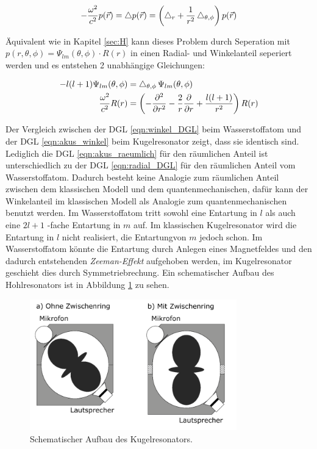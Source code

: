 \begin{equation}
    - \frac{\omega^2}{c^2} p(\vec{r}) = \mathop{}\!\mathbin\bigtriangleup p(\vec{r}) = \left( \mathop{}\!\mathbin\bigtriangleup_r + \frac{1}{r^2} \mathop{}\!\mathbin\bigtriangleup_{\theta, \phi} \right) p(\vec{r})
    \label{eqn:stationaer}
\end{equation}

Äquivalent wie in Kapitel \ref{sec:H} kann dieses Problem durch Seperation mit $p(r, \theta, \phi) = \Psi_{lm}(\theta, \phi) \cdot R(r)$ in einen Radial- und Winkelanteil seperiert werden und es entstehen 2 unabhängige Gleichungen:

\begin{align}
    -l(l+1) \Psi_{lm} (\theta, \phi) &= \mathop{}\!\mathbin\bigtriangleup_{\theta, \phi} \, \Psi_{lm} (\theta, \phi)
    \label{eqn:akus_winkel} \\
    \frac{\omega^2}{c^2} R(r) &= \left( - \frac{\partial^2}{\partial r^2} - \frac{2}{r} \frac{\partial}{\partial r} + \frac{l(l+1)}{r^2} \right) R(r)
    \label{eqn:akus_raeumlich}
\end{align}

Der Vergleich zwischen der DGL \eqref{eqn:winkel_DGL} beim Wasserstoffatom und der DGL \eqref{eqn:akus_winkel} beim Kugelresonator zeigt, dass sie identisch sind. Lediglich die DGL \eqref{eqn:akus_raeumlich} für den räumlichen Anteil ist unterschiedlich zu der DGL \eqref{eqn:radial_DGL} für den räumlichen Anteil vom Wasserstoffatom. Dadurch besteht keine Analogie zum räumlichen Anteil zwischen dem klassischen Modell und dem quantenmechanischen, dafür kann der Winkelanteil im klassischen Modell als Analogie zum quantenmechanischen benutzt werden. Im Wasserstoffatom tritt sowohl eine Entartung in $l$ als auch eine $2l+1$ -fache Entartung in $m$ auf. Im klassischen Kugelresonator wird die Entartung in $l$ nicht realisiert, die Entartungvon $m$ jedoch schon. Im Wasserstoffatom könnte die Entartung durch Anlegen eines Magnetfeldes und den dadurch entstehenden \textit{Zeeman-Effekt} aufgehoben werden, im Kugelresonator geschieht dies durch Symmetriebrechung. Ein schematischer Aufbau des Hohlresonators ist in Abbildung \ref{fig:modell} zu sehen.

\begin{figure}[H]
    \centering
    \includegraphics[width=0.8\textwidth]{build/Skizze.PNG}
    \caption{Schematischer Aufbau des Kugelresonators. \cite{Anleitung}}
    \label{fig:modell}
\end{figure}

